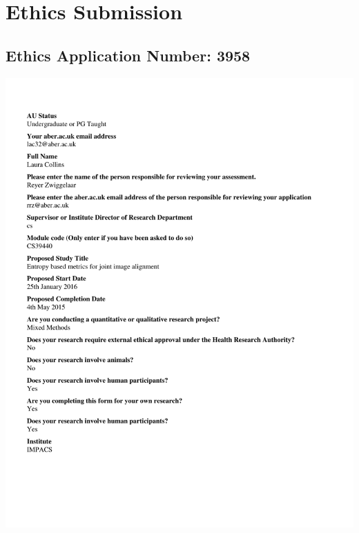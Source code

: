 \chapter{Ethics Submission}
\label{appendix:ethics}


\section{Ethics Application Number: 3958}
  \includegraphics[scale = 0.7,clip,trim=10mm 25mm 25mm 18mm]{Appendix2/3958.pdf}
  
